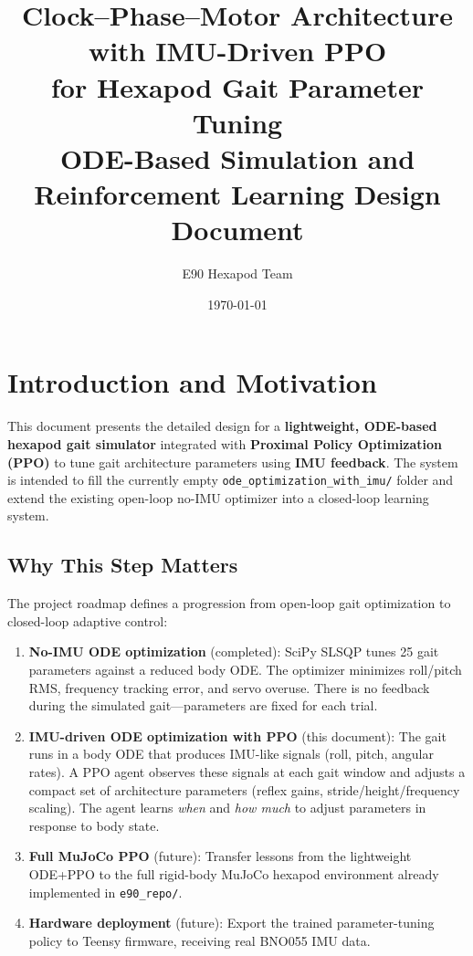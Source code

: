 \documentclass[11pt]{article}
\title{%
Clock--Phase--Motor Architecture with IMU-Driven PPO\\
for Hexapod Gait Parameter Tuning\\[0.5em]
\large ODE-Based Simulation and Reinforcement Learning Design Document
}
\author{E90 Hexapod Team}
\date{\today}
\begin{document}
\maketitle
\tableofcontents
\newpage

\section{Introduction and Motivation}

This document presents the detailed design for a \textbf{lightweight, ODE-based hexapod gait simulator} integrated with \textbf{Proximal Policy Optimization (PPO)} to tune gait architecture parameters using \textbf{IMU feedback}. The system is intended to fill the currently empty \texttt{ode\_optimization\_with\_imu/} folder and extend the existing open-loop no-IMU optimizer into a closed-loop learning system.

\subsection{Why This Step Matters}

The project roadmap defines a progression from open-loop gait optimization to closed-loop adaptive control:

\begin{enumerate}
    \item \textbf{No-IMU ODE optimization} (completed): SciPy SLSQP tunes 25 gait parameters against a reduced body ODE. The optimizer minimizes roll/pitch RMS, frequency tracking error, and servo overuse. There is no feedback during the simulated gait---parameters are fixed for each trial.
    \item \textbf{IMU-driven ODE optimization with PPO} (this document): The gait runs in a body ODE that produces IMU-like signals (roll, pitch, angular rates). A PPO agent observes these signals at each gait window and adjusts a compact set of architecture parameters (reflex gains, stride/height/frequency scaling). The agent learns \emph{when} and \emph{how much} to adjust parameters in response to body state.
    \item \textbf{Full MuJoCo PPO} (future): Transfer lessons from the lightweight ODE+PPO to the full rigid-body MuJoCo hexapod environment already implemented in \texttt{e90\_repo/}.
    \item \textbf{Hardware deployment} (future): Export the trained parameter-tuning policy to Teensy firmware, receiving real BNO055 IMU data.
\end{enumerate}
\end{document}
